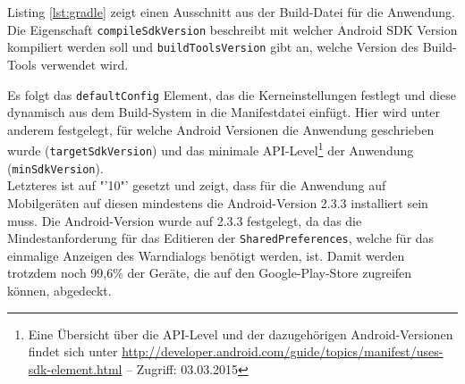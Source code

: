 Listing \ref{lst:gradle} zeigt einen Ausschnitt aus der Build-Datei für die Anwendung. \\
Die Eigenschaft \texttt{compileSdkVersion} beschreibt mit welcher Android \gls{SDK} Version kompiliert werden soll und \texttt{buildToolsVersion} gibt an, welche Version des Build-Tools verwendet wird.
\begin{center}
\grayRule \grayRule
\end{center}
Es folgt das \texttt{defaultConfig} Element, das die Kerneinstellungen festlegt und diese dynamisch aus dem Build-System in die  Manifestdatei einfügt. Hier wird unter anderem festgelegt, für welche Android Versionen die Anwendung geschrieben wurde (\texttt{targetSdkVersion}) und das minimale \gls{API}-Level\footnote{ Eine Übersicht über die \gls{API}-Level und der dazugehörigen Android-Versionen findet sich unter \url{http://developer.android.com/guide/topics/manifest/uses-sdk-element.html} -- Zugriff: 03.03.2015} der Anwendung (\texttt{minSdkVersion}).\\ 
Letzteres ist auf "'10"' gesetzt und zeigt, dass für die Anwendung auf Mobilgeräten auf diesen mindestens die Android-Version 2.3.3 installiert sein muss. 
Die Android-Version wurde auf 2.3.3 festgelegt, da das die Mindestanforderung für das Editieren der \texttt{SharedPreferences}, welche für das einmalige Anzeigen des Warndialogs benötigt werden, ist. Damit werden trotzdem noch 99,6\% der Geräte, die auf den Google-Play-Store zugreifen können, abgedeckt. \cite{android_version} 
%
%
\clearpage
